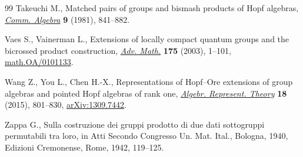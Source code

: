 \begin{thebibliography}{99}
Takeuchi M., Matched pairs of groups and bismash products of {H}opf algebras,
 \href{https://doi.org/10.1080/00927878108822621}{\textit{Comm. Algebra}} \textbf{9} (1981), 841--882.

Vaes S., Vainerman L., Extensions of locally compact quantum groups and the
 bicrossed product construction, \href{https://doi.org/10.1016/S0001-8708(02)00040-3}{\textit{Adv. Math.}} \textbf{175} (2003),
 1--101, \href{https://arxiv.org/abs/math.OA/0101133}{math.OA/0101133}.

Wang Z., You L., Chen H.-X., Representations of {H}opf--{O}re extensions of
 group algebras and pointed {H}opf algebras of rank one, \href{https://doi.org/10.1007/s10468-015-9517-z}{\textit{Algebr.
 Represent. Theory}} \textbf{18} (2015), 801--830, \href{https://arxiv.org/abs/1309.7442}{arXiv:1309.7442}.

Zappa G., Sulla costruzione dei gruppi prodotto di due dati sottogruppi
 permutabili tra loro, in Atti {S}econdo {C}ongresso {U}n. {M}at. {I}tal.,
 {B}ologna, 1940, Edizioni Cremonense, Rome, 1942, 119--125.

\end{thebibliography}
